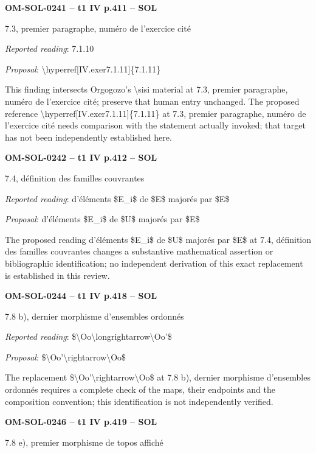 \par\noindent\textbf{OM-SOL-0241 -- t1 IV p.411 -- SOL}\par
7.3, premier paragraphe, numéro de l'exercice cité\par
\emph{Reported reading}: 7.1.10\par
\emph{Proposal}: \textbackslash{}hyperref[IV.exer7.1.11]\{7.1.11\}\par
This finding intersects Orgogozo's \textbackslash{}sisi material at 7.3, premier paragraphe, numéro de l'exercice cité; preserve that human entry unchanged. The proposed reference \textbackslash{}hyperref[IV.exer7.1.11]\{7.1.11\} at 7.3, premier paragraphe, numéro de l'exercice cité needs comparison with the statement actually invoked; that target has not been independently established here.\par
\par\noindent\textbf{OM-SOL-0242 -- t1 IV p.412 -- SOL}\par
7.4, définition des familles couvrantes\par
\emph{Reported reading}: d'éléments \$E\_i\$ de \$E\$ majorés par \$E\$\par
\emph{Proposal}: d'éléments \$E\_i\$ de \$U\$ majorés par \$E\$\par
The proposed reading d'éléments \$E\_i\$ de \$U\$ majorés par \$E\$ at 7.4, définition des familles couvrantes changes a substantive mathematical assertion or bibliographic identification; no independent derivation of this exact replacement is established in this review.\par
\par\noindent\textbf{OM-SOL-0244 -- t1 IV p.418 -- SOL}\par
7.8 b), dernier morphisme d'ensembles ordonnés\par
\emph{Reported reading}: \$\textbackslash{}Oo\textbackslash{}longrightarrow\textbackslash{}Oo'\$\par
\emph{Proposal}: \$\textbackslash{}Oo'\textbackslash{}rightarrow\textbackslash{}Oo\$\par
The replacement \$\textbackslash{}Oo'\textbackslash{}rightarrow\textbackslash{}Oo\$ at 7.8 b), dernier morphisme d'ensembles ordonnés requires a complete check of the maps, their endpoints and the composition convention; this identification is not independently verified.\par
\par\noindent\textbf{OM-SOL-0246 -- t1 IV p.419 -- SOL}\par
7.8 e), premier morphisme de topos affiché\par
